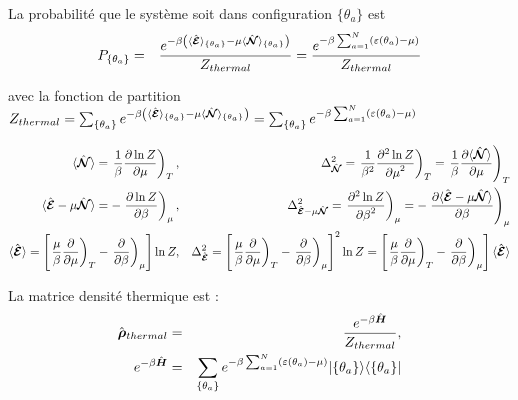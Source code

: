 	
	La probabilité que le système soit dans configuration $\{ \theta_a \}$  est 
	\begin{eqnarray}
		P_{\{\theta_a \}} & = & \frac{e^{- \beta \left ( \langle \hat{\bm{\mathcal{E}}} \rangle_{\{\theta_a \}}   - \mu \langle \hat{\bm{\mathcal{N}}} \rangle_{\{\theta_a \}} \right )}}{Z_{thermal}} = \frac{e^{- \beta \sum_{a=1}^N  ( \varepsilon( \theta_a )   - \mu  )}}{Z_{thermal}}	
	\end{eqnarray}
	
	avec la fonction de partition $Z_{thermal} = \sum_{\{ \theta_a\}}e^{- \beta \left ( \langle \hat{\bm{\mathcal{E}}} \rangle_{\{\theta_a \}}   - \mu \langle \hat{\bm{\mathcal{N}}} \rangle_{\{\theta_a \}} \right )} = \sum_{\{ \theta_a\}} e^{- \beta \sum_{a=1}^N  ( \varepsilon( \theta_a )   - \mu  )}$
	
	\begin{eqnarray}
		\langle \hat{\bm{\mathcal{N}}} \rangle  = \left .\frac{1}{\beta} \frac{ \partial \ln Z}{\partial \mu } \right )_T,  & & \Delta^2_{\hat{\bm{\mathcal{N}}}} = \left . \frac{1}{\beta^2} \frac{ \partial^2 \ln Z}{{\partial \mu}^2 } \right )_T =  \left . \frac{1}{\beta} \frac{ \partial \langle \hat{\bm{\mathcal{N}}} \rangle}{\partial \mu } \right )_T\\
		\langle \hat{\bm{\mathcal{E}}} - \mu\hat{\bm{\mathcal{N}}}  \rangle  = -\left . \frac{ \partial \ln Z}{\partial \beta } \right )_\mu,  & & \Delta^2_{\hat{\bm{\mathcal{E}}} - \mu\hat{\bm{\mathcal{N}}}} = \left .  \frac{ \partial^2 \ln Z}{{\partial \beta}^2 } \right )_\mu =  -\left .  \frac{ \partial \langle \hat{\bm{\mathcal{E}}} - \mu\hat{\bm{\mathcal{N}}} \rangle}{\partial \beta } \right )_\mu	\\
		\langle \hat{\bm{\mathcal{E}}} \rangle  = \left [ \left .\frac{\mu}{\beta} \frac{ \partial}{\partial \mu } \right )_T -\left . \frac{ \partial }{\partial \beta } \right )_\mu  \right ]\ln Z,  & & \Delta^2_{\hat{\bm{\mathcal{E}}} } = \left [ \left .\frac{\mu}{\beta} \frac{ \partial}{\partial \mu } \right )_T -\left . \frac{ \partial }{\partial \beta } \right )_\mu  \right ]^2\ln Z=  \left [ \left .\frac{\mu}{\beta} \frac{ \partial}{\partial \mu } \right )_T -\left . \frac{ \partial }{\partial \beta } \right )_\mu  \right ]\langle \hat{\bm{\mathcal{E}}} \rangle	
	\end{eqnarray}

	
	
	La matrice densité thermique est :
	\begin{eqnarray}
		\hat{\bm{\rho}}_{thermal} & = & \frac{e^{- \beta \hat{\bm{H}}}}{Z_{thermal}}, \\
		e^{-\beta \hat{\bm{H}}} & = & 	\sum_{\{\theta_a \}} e^{- \beta \sum_{a=1}^N ( \varepsilon(\theta_a)- \mu ) } \vert \{ \theta_a\} \rangle \langle  \{ \theta_a\}  \vert 
	\end{eqnarray}